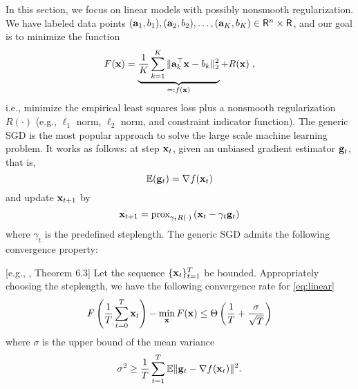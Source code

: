 \vspace{-0.5em}
In this section, we focus on linear models with possibly nonsmooth regularization. We have labeled data points $({\bf a}_1, b_1), ({\bf a}_2, b_2), \ldots, ({\bf a}_K, b_K) \in \mathsf{R}^n \times \mathsf{R}$, and our goal is to minimize the function
\vspace{-0.5em}
\begin{align}
F({\bf x}) = \underbrace{\frac{1}{K} \sum_{k = 1}^K \| {\bf a}_k^\top {\bf x} - b_k \|_2^2}_{=: f({\bf x})} + R({\bf x}) \; ,
\label{eq:linear}
\end{align}
i.e., minimize the empirical least squares loss plus a nonsmooth regularization $R(\cdot)$ (e.g., $\ell_1$ norm, $\ell_2$ norm, and constraint indicator function). The generic SGD is the most popular approach to solve the large scale machine learning problem. It works as follows: at step ${\bf x}_t$, given an unbiased gradient estimator ${\bf g}_t$, that is, 
\[
\mathbb{E}({\bf g}_t) = \nabla f({\bf x}_t)
\]
and update ${\bf x}_{t+1}$ by
\[
{\bf x}_{t+1} = \text{prox}_{\gamma_t R(\cdot)}\left( {\bf x}_t - \gamma_t {\bf g}_t\right)
\]
where $\gamma_t$ is the predefined steplength. The generic SGD admits the following convergence property:
\begin{theorem}\label{thm:sgd-conv}[e.g., \cite{2014arXiv1405.4980B}, Theorem 6.3]
Let the sequence $\{{\bf x}_t\}_{t=1}^T$ be bounded. Appropriately choosing the steplength,%
we have the following convergence rate for \eqref{eq:linear}
% 
\begin{equation}
F\left(\frac{1}{T} \sum_{t = 0}^T {\bf x}_t\right) - \min_{{\bf x}}F({\bf x}) \leq \Theta\left({1\over T} + {\sigma \over \sqrt{T}}\right) 
\label{eq:sgd-conv}
\end{equation}
where $\sigma$ is the upper bound of the mean variance 
\[
\sigma^2 \geq {1\over T}\sum_{t=1}^T \mathbb{E}\|{\bf g}_t - \nabla f({\bf x}_t)\|^2. 
\]
\end{theorem} 
\vspace{-0.5em}
